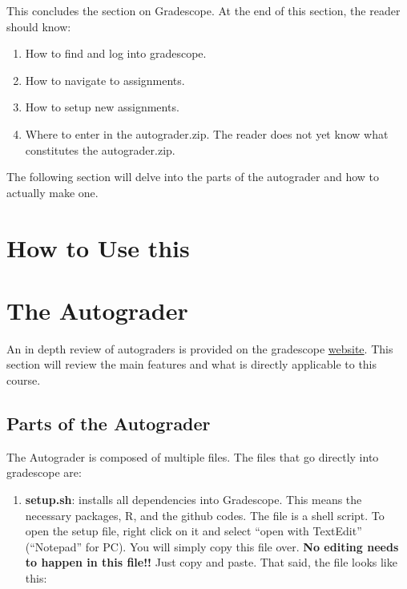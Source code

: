 \documentclass[
]{article}
\providecommand{\tightlist}{%
  \setlength{\itemsep}{0pt}\setlength{\parskip}{0pt}}
\begin{document}
This concludes the section on Gradescope. At the end of this section,
the reader should know:

\begin{enumerate}
\def\labelenumi{(\arabic{enumi})}
\item
  How to find and log into gradescope.
\item
  How to navigate to assignments.
\item
  How to setup new assignments.
\item
  Where to enter in the autograder.zip. The reader does not yet know
  what constitutes the autograder.zip.
\end{enumerate}

The following section will delve into the parts of the autograder and
how to actually make one.

\hypertarget{how-to-use-this}{%
\section{How to Use this}\label{how-to-use-this}}

\hypertarget{the-autograder}{%
\section{The Autograder}\label{the-autograder}}

An in depth review of autograders is provided on the gradescope
\href{https://gradescope-autograders.readthedocs.io/en/latest/}{website}.
This section will review the main features and what is directly
applicable to this course.

\hypertarget{parts-of-the-autograder}{%
\subsection{Parts of the Autograder}\label{parts-of-the-autograder}}

The Autograder is composed of multiple files. The files that go directly
into gradescope are:

\begin{enumerate}
\def\labelenumi{(\arabic{enumi})}
\tightlist
\item
  \textbf{setup.sh}: installs all dependencies into Gradescope. This
  means the necessary packages, R, and the github codes. The file is a
  shell script. To open the setup file, right click on it and select
  ``open with TextEdit'' (``Notepad'' for PC). You will simply copy this
  file over. \textbf{No editing needs to happen in this file!!} Just
  copy and paste. That said, the file looks like this:
\end{enumerate}
\end{document}
